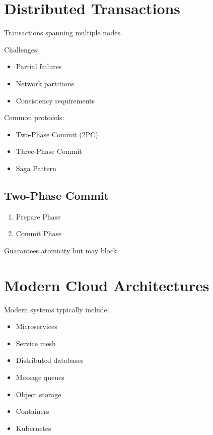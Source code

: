 \section{Distributed Transactions}

Transactions spanning multiple nodes.

Challenges:

\begin{itemize}
\item Partial failures
\item Network partitions
\item Consistency requirements
\end{itemize}

Common protocols:

\begin{itemize}
\item Two-Phase Commit (2PC)
\item Three-Phase Commit
\item Saga Pattern
\end{itemize}

\subsection{Two-Phase Commit}

\begin{enumerate}
\item Prepare Phase
\item Commit Phase
\end{enumerate}

Guarantees atomicity but may block.

\section{Modern Cloud Architectures}

Modern systems typically include:

\begin{itemize}
\item Microservices
\item Service mesh
\item Distributed databases
\item Message queues
\item Object storage
\item Containers
\item Kubernetes
\end{itemize}

